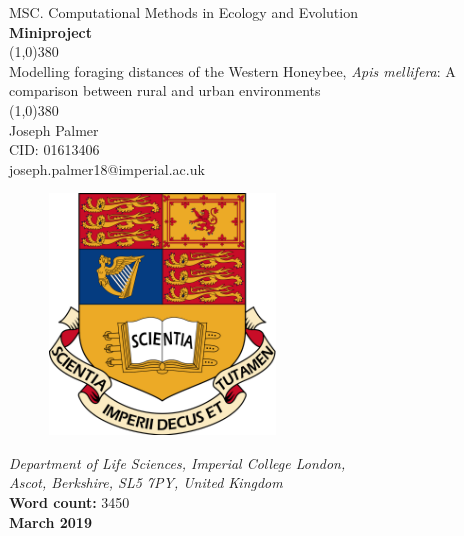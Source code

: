 \documentclass[11pt]{article}
\begin{document}
\begin{titlepage}
\begin{center}
	\large{MSC. Computational Methods in Ecology and Evolution }\\
	\textbf{ Miniproject }\\[0cm]
	\huge{\line(1,0){380}\\
		Modelling foraging distances of the Western Honeybee, \textit{Apis mellifera}: A comparison between rural and urban environments\\
	\line(1,0){380}}\\[1cm]
	\large{ Joseph Palmer\\ CID: 01613406}\\[0cm]
	{joseph.palmer18@imperial.ac.uk }\\[1.2cm]
	\begin{figure}[h]
	\includegraphics[width=6cm]{../Writeup/WriteupImages/ImperialCrest.png}
	\centering
	\end{figure}
	\normalsize{\textit{Department of Life Sciences, Imperial College London,}\\
		\textit{Ascot, Berkshire, SL5 7PY, United Kingdom}}\\[0.5cm]
	\small{\textbf{Word count:} 3450}\\
	\small{\textbf{March 2019}}
\end{center}
\end{titlepage}
\newpage
\tableofcontents
\newpage
\end{document}

